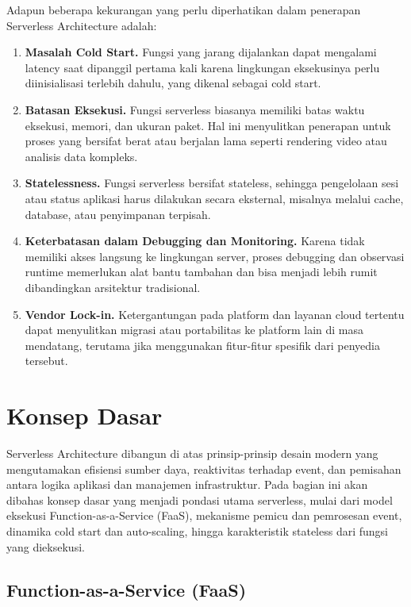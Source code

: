 Adapun beberapa kekurangan yang perlu diperhatikan dalam penerapan Serverless Architecture adalah:
\begin{enumerate}
	\item \textbf{Masalah Cold Start.} Fungsi yang jarang dijalankan dapat mengalami latency saat dipanggil pertama kali karena lingkungan eksekusinya perlu diinisialisasi terlebih dahulu, yang dikenal sebagai cold start.
	
	\item \textbf{Batasan Eksekusi.} Fungsi serverless biasanya memiliki batas waktu eksekusi, memori, dan ukuran paket. Hal ini menyulitkan penerapan untuk proses yang bersifat berat atau berjalan lama seperti rendering video atau analisis data kompleks.
	
	\item \textbf{Statelessness.} Fungsi serverless bersifat stateless, sehingga pengelolaan sesi atau status aplikasi harus dilakukan secara eksternal, misalnya melalui cache, database, atau penyimpanan terpisah.
	
	\item \textbf{Keterbatasan dalam Debugging dan Monitoring.} Karena tidak memiliki akses langsung ke lingkungan server, proses debugging dan observasi runtime memerlukan alat bantu tambahan dan bisa menjadi lebih rumit dibandingkan arsitektur tradisional.
	
	\item \textbf{Vendor Lock-in.} Ketergantungan pada platform dan layanan cloud tertentu dapat menyulitkan migrasi atau portabilitas ke platform lain di masa mendatang, terutama jika menggunakan fitur-fitur spesifik dari penyedia tersebut.
\end{enumerate}



\section{Konsep Dasar}

Serverless Architecture dibangun di atas prinsip-prinsip desain modern yang mengutamakan efisiensi sumber daya, reaktivitas terhadap event, dan pemisahan antara logika aplikasi dan manajemen infrastruktur. Pada bagian ini akan dibahas konsep dasar yang menjadi pondasi utama serverless, mulai dari model eksekusi Function-as-a-Service (FaaS), mekanisme pemicu dan pemrosesan event, dinamika cold start dan auto-scaling, hingga karakteristik stateless dari fungsi yang dieksekusi.

\subsection{Function-as-a-Service (FaaS)}

